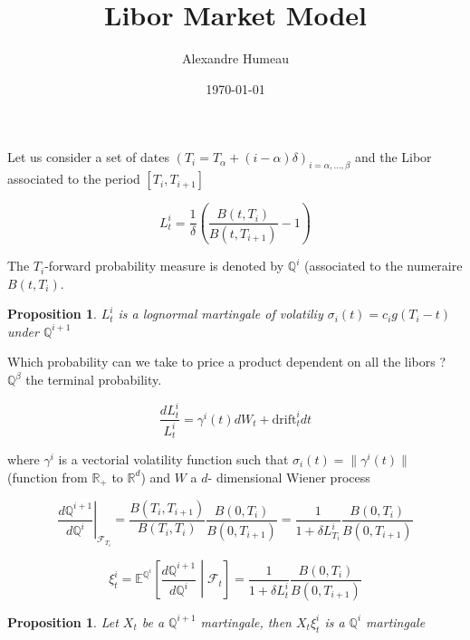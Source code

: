 \documentclass{article}
\newtheorem{proposition}[theorem]{Proposition}
\begin{document}
\title{Libor Market Model}
\author{Alexandre Humeau}
\date{\today}
\maketitle

\noindent Let us consider a set of dates $(T_i = T_\alpha + (i - \alpha) \delta)_{i=\alpha,\dots,\beta}$ and the Libor associated to the period $\left[T_i, T_{i+1}\right]$

\begin{equation*}
	L_t^i = \frac{1}{\delta} \left(\frac{B\left(t,T_i\right)}{B\left(t,T_{i+1}\right)}-1\right)
\end{equation*}

\noindent The $T_i$-forward probability measure is denoted by $\mathbb{Q}^i$ (associated to the numeraire $B(t,T_i)$.

\begin{proposition}
	$L_t^i$ is a lognormal martingale of volatiliy $\sigma_i(t) = c_i g(T_i-t)$ under $\mathbb{Q}^{i+1}$
\end{proposition}

Which probability can we take to price a product dependent on all the libors ? $\mathbb{Q}^\beta$ the terminal probability.

\begin{equation}
	\frac{dL_t^i}{L_t^i} = \gamma^i(t) dW_t + \text{drift}^i_t dt
\end{equation}

where $\gamma^i$ is a vectorial volatility function such that $\sigma_i(t) = \|\gamma^i(t)\|$ (function from $\mathbb{R}_+$ to $\mathbb{R}^d$) and $W$ a $d$- dimensional Wiener process

\begin{equation*}
	\left.\frac{d\mathbb{Q}^{i+1}}{d\mathbb{Q}^i} \right|_{\mathcal{F}_{T_i}} = \frac{B\left(T_i,T_{i+1}\right)}{B\left(T_i,T_i\right)}\frac{B\left(0,T_i\right)}{B\left(0,T_{i+1}\right)} = \frac{1}{1 + \delta L_{T_i}^i}\frac{B\left(0,T_i\right)}  {B\left(0,T_{i+1}\right)}
\end{equation*}

\begin{equation*}
	\xi_t^i = \mathbb{E}^{\mathbb{Q}^i} \left[\frac{d\mathbb{Q}^{i+1}}{d\mathbb{Q}^i}\middle|\mathcal{F}_t\right] =  \frac{1}{1 + \delta L_{t}^i}\frac{B\left(0,T_i\right)}  {B\left(0,T_{i+1}\right)}
\end{equation*}

\begin{proposition}
	Let $X_t$ be a $\mathbb{Q}^{i+1}$ martingale, then $X_t \xi_t^i$ is a $\mathbb{Q}^{i}$ martingale
\end{proposition}
\end{document}
